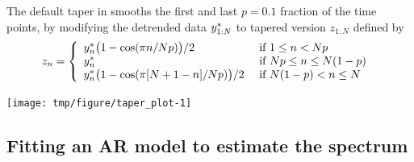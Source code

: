 \begin{frame}[fragile]

The default taper in {\Rlanguage} smooths the first and last $p=0.1$ fraction of the time points, by modifying the detrended data $y_{1:N}^*$ to tapered version ${z_{1:N}}$ defined by
\begin{equation} \nonumber
{z_n} =
  \left\{
  \begin{array}{ll}
    y_n^* \big(1-\cos(\pi n/Np)\big)/2 & \mbox{ if $1\le n< Np$ } \\
    y_n^*  & \mbox{ if $Np \le n \le N(1-p)$ } \\
    y_n^* \big(1-\cos(\pi [N+1-n]/Np)\big)/2 & \mbox{ if $N(1-p)<n\le N$ }
  \end{array}\right.
\end{equation}

\vspace{-3mm}

\begin{knitrout}\small
{}\color{fgcolor}\begin{kframe}
\begin{alltt}
\hldef{(}\hldef{(}\hldef{(}\hldef{,}\hldef{)),}\hldef{=}\hldef{,}
  \hldef{=}\hldef{)}
\hldef{(}\hldef{=}\hldef{(}\hldef{,}\hldef{),}\hldef{=}\hldef{,}\hldef{=}\hldef{)}
\end{alltt}
\end{kframe}
\end{knitrout}

\vspace{-3mm}

\begin{knitrout}\small
{}\color{fgcolor}

{\centering \texttt{[image: tmp/figure/taper\_plot-1]} 

}


\end{knitrout}

\end{frame}


\subsection{Fitting an AR model to estimate the spectrum}


